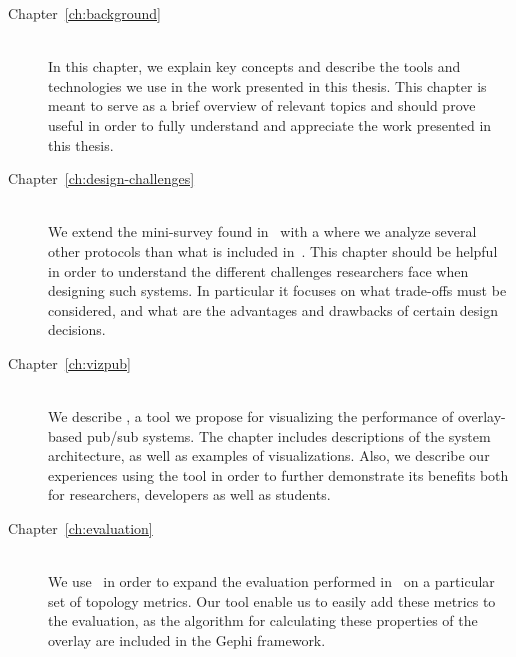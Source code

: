 \begin{description}
    \item[Chapter~\ref{ch:background}] \hfill \\

        In this chapter, we explain key concepts and describe the tools
        and technologies we use in the work presented in this thesis.
        This chapter is meant to serve as a brief overview of relevant
        topics and should prove useful in order to fully understand and
        appreciate the work presented in this thesis.

    \item[Chapter~\ref{ch:design-challenges}] \hfill \\

        We extend the mini-survey found in~\cite{Setty:2012} with a
        where we analyze several other protocols than what is included
        in~\cite{Setty:2012}. This chapter should be helpful in order to
        understand the different challenges researchers face when
        designing such systems. In particular it focuses on what
        trade-offs must be considered, and what are the advantages and
        drawbacks of certain design decisions.

    \item[Chapter~\ref{ch:vizpub}] \hfill \\

        We describe \demo, a tool we propose for visualizing the
        performance of overlay-based pub/sub systems. The chapter
        includes descriptions of the system architecture, as well as
        examples of visualizations. Also, we describe our experiences
        using the tool in order to further demonstrate its benefits both
        for researchers, developers as well as students.

    \item[Chapter~\ref{ch:evaluation}] \hfill \\

       We use \demo~in order to expand the evaluation performed
       in~\cite{Setty:2012} on a particular set of topology metrics. Our
       tool enable us to easily add these metrics to the evaluation, as
       the algorithm for calculating these properties of the overlay are
       included in the Gephi framework.



\end{description}
